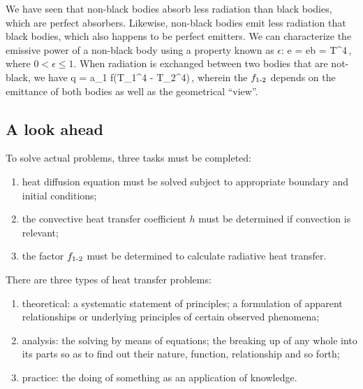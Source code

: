 We have seen that non-black bodies absorb less radiation than black bodies, which are perfect absorbers. Likewise, non-black bodies emit less radiation that black bodies, which also happens to be perfect emitters. We can characterize the emissive power of a non-black body using a property known as  $\epsilon$:
\beq
e = \epsilon e\txt b = \epsilon\sigma T^4\,,
\eeq
where $0 < \epsilon\leq 1$. When radiation is exchanged between two bodies that are not-black, we have
\beq
q = a_1 f\sigma\left(T_1^4 - T_2^4\right)\,,
\eeq
wherein the  $f_\text{1-2}$ depends on the emittance of both bodies as well as the geometrical ``view''.


\subsection{A look ahead}
To solve actual problems, three tasks must be completed:
\begin{enumerate}
\item heat diffusion equation must be solved subject to appropriate boundary and initial conditions;
\item the convective heat transfer coefficient $h$ must be determined if convection is relevant;
\item the factor $f_\text{1-2}$ must be determined to calculate radiative heat transfer.
\end{enumerate}

There are three types of heat transfer problems:
\begin{enumerate}
\item theoretical: a systematic statement of principles; a formulation of apparent relationships or underlying principles of certain observed phenomena;
\item analysis: the solving by means of equations; the breaking up of any whole into its parts so as to find out their nature, function, relationship and so forth;
\item practice: the doing of something as an application of knowledge.
\end{enumerate}
